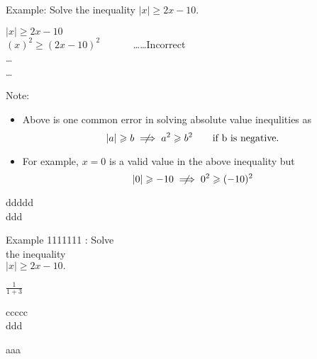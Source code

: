 \begin{tcbraster}[raster equal height,
enhanced,
title=tolorbox ABC  \thetcbrasternum]
\begin{tcolorbox}    
    Example: Solve the inequality $ \lvert x \rvert \geqslant 2x-10. $

\begin{warningEnv}
     $ \lvert x \rvert \geqslant 2x-10 $ \\
     $ (x)^2 \geqslant (2x-10)^2 \quad \quad \quad $ \dots \dots Incorrect \\
     \dots \\
     \dots     
\end{warningEnv}

 


Note:
\begin{itemize}
       \item[] Above is one common error in solving absolute value inequlities as 
                \[    \lvert a \rvert \geqslant b       \centernot\implies     a^2 \geqslant b^2  \quad  \quad \text{if b is negative.} \]    
    
      \item[]  For example, $x=0$ is a valid value in the above inequality but
                \[     \lvert 0 \rvert \geqslant -10       \centernot\implies     0^2 \geqslant (-10)^2 \] 
\end{itemize}
\end{tcolorbox}
\begin{tcolorbox}    
 ddddd\\
 
 ddd
 
    Example 1111111  : Solve
    \\
    the inequality \\
    $ \lvert x \rvert \geqslant 2x-10. $



$\frac{1}{1+3}$
\end{tcolorbox}
\begin{tcolorbox}
  ccccc\\
  ddd
  
\end{tcolorbox}
\begin{tcolorbox}aaa \end{tcolorbox}
\end{tcbraster}


\clearpage


